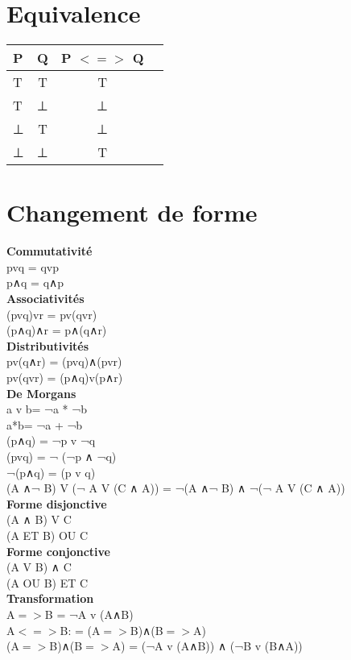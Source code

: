 \vspace{4mm}

\section{Equivalence}
\begin{tabular}{|l|c|c|c|}
  \hline
  P & Q & P $<=>$ Q \\
  \hline
  T & T & T \\
  T & ⊥ & ⊥ \\
  ⊥ & T & ⊥ \\
  ⊥ & ⊥ & T \\
  \hline
\end{tabular}

\newpage
\section{Changement de forme}
\vspace{5mm} %
\textbf{Commutativité} \\

pvq = qvp \\
p∧q = q∧p \\

\vspace{5mm} %
\textbf{Associativités} \\

(pvq)vr = pv(qvr) \\
(p∧q)∧r = p∧(q∧r) \\

\vspace{5mm} %
\textbf{Distributivités} \\

pv(q∧r) = (pvq)∧(pvr) \\
pv(qvr) = (p∧q)v(p∧r) \\

\vspace{5mm} %
\textbf{De Morgans} \\

a v b= ¬a * ¬b\\
a*b= ¬a + ¬b\\
(p∧q) = ¬p v ¬q  \\
(pvq) = ¬ (¬p ∧ ¬q)  \\
¬(p∧q) = (p v q)  \\
(A ∧¬ B) V (¬ A V (C ∧ A)) =  ¬(A ∧¬ B) ∧ ¬(¬ A V (C ∧ A))\\

\vspace{5mm} %
\textbf{Forme disjonctive} \\

(A ∧ B) V C\\
(A ET B) OU C \\

\vspace{5mm} %
\textbf{Forme conjonctive} \\

(A V B) ∧ C\\
(A OU B) ET C \\

\vspace{5mm} %
\textbf{Transformation} \\

A$=>$B = ¬A v (A∧B) \\
A$<=>$B: = (A$=>$B)∧(B$=>$A)  \\
(A$=>$B)∧(B$=>$A) = (¬A v (A∧B)) ∧ (¬B v (B∧A))
